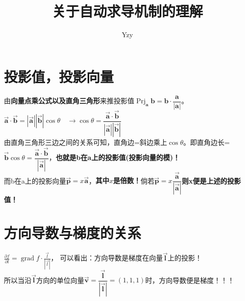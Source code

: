 \documentclass[UTF8]{article}
\begin{document}
    \title{关于自动求导机制的理解}
    \author{Yzy}
    \maketitle
    \tableofcontents

    \section{投影值，投影向量}
    由\textbf{向量点乘公式以及直角三角形}来推投影值$\operatorname{Prj}_{\mathbf{a}} \mathbf{b}=\mathbf{b} \cdot \dfrac{\mathbf{a}}{|\mathbf{a}|}$。
    \\
    $\vec{\bm{a}}\cdot \vec{\bm{b}}=|\bm{\vec{a}}||\bm{\vec{b}}|\cos \theta \quad \rightarrow \cos \theta = \dfrac{\vec{\bm{a}}\cdot \vec{\bm{b}}}{|\bm{\vec{a}}||\bm{\vec{b}}|}$
    \\
    由直角三角形三边之间的关系可知，直角边=斜边乘上$\cos \theta$。即直角边长=$\bm{\vec{b}}\cos \theta=\dfrac{\bm{\vec{a}}\cdot \bm{\vec{b}}}{|\bm{\vec{a}}|}$，\textbf{也就是b在a上的投影值(投影向量的模)！}
    \\
    而b在a上的投影向量$\bm{\vec{p}}=x\bm{\vec{a}}$，\textbf{其中$x$是倍数！}倘若$\bm{\vec{p}}=x\dfrac{\bm{\vec{a}}}{|\bm{\vec{a}}|}$\textbf{则x便是上述的投影值！}
    
    \section{方向导数与梯度的关系}
    $\frac{\partial f}{\partial l}=\operatorname{grad} f \cdot \frac{\vec{l}}{|\vec{l}|}$， 可以看出：方向导数是梯度在向量$\bm{\vec{l}}$上的投影！\\
    所以当沿$\bm{\vec{l}}$方向的单位向量$\bm{\vec{v}}=\dfrac{\bm{\vec{l}}}{|\bm{\vec{l}}|}=(1, 1, 1)$时，方向导数便是梯度！！！
    
\end{document}
